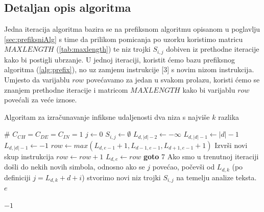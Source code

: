 \documentclass[times, utf8, zavrsni]{fer}
\begin{document}
\subsection{Detaljan opis algoritma}
Jedna iteracija algoritma bazira se na prefiksnom algoritmu opisanom u poglavlju \ref{sec:prefiksniAlg} s time da prilikom pomicanja po uzorku koristimo matricu $MAXLENGTH$ (\ref{tab:maxlength}) te niz trojki $S_{i,j}$ dobiven iz prethodne iteracije kako bi postigli ubrzanje. U jednoj iteraciji, koristit ćemo bazu prefiksnog algoritma (\ref{alg:prefix}), no uz zamjenu instrukcije [3] s novim nizom instrukcija. Umjesto da varijablu $row$ povećavamo za jedan u svakom prolazu, koristi ćemo se znanjem prethodne iteracije i matricom $MAXLENGTH$ kako bi varijablu $row$ povećali za veće iznose.

\begin{algorithm}
\caption{Algoritam za izračunavanje infiksne udaljenosti dva niza s najviše $k$ razlika}\label{alg:infix}
\begin{algorithmic}[1]
\State $\#$ $C_{CH} = C_{DE} = C_{IN} = 1$
\State $j \gets 0$
\State $S_{i,j} \gets \emptyset$
    \State $L_{d,|d|-2} \gets -\infty$
     \State $L_{d,|d|-1} \gets |d|-1$
    \Else \State $L_{d,|d|-1} \gets -1$
    \EndIf
\EndFor
\linebreak
{}
        \State $row\gets max(L_{d,e-1} + 1, L_{d-1,e-1}, L_{d+1,e-1} + 1)$
        \State Izvrši novi skup instrukcija       
            \State $row\gets row+1$
        \EndWhile
        \State[5] $L_{d,e}\gets row$
        \State
            \State \textbf{goto} 7
        \EndIf
    \EndFor
\EndFor
	\State [7] Ako smo u trenutnoj iteraciji došli do nekih novih simbola, odnosno ako se $j$ povećao, počevši od $L_{d,k}$ (po definiciji $j=L_{d,k}+d+i$) stvorimo novi niz trojki $S_{i,j}$ na temelju analize teksta.
    	\State \Return $e$
    \EndIf
    
\EndFor
\linebreak
\Return $-1$
\end{algorithmic}
\end{algorithm}
\end{document}
